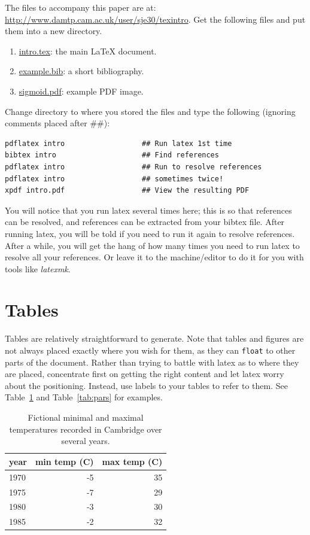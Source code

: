 \documentclass[]{article}
\providecommand*{\latex}{\LaTeX\xspace}
\begin{document}
The files to accompany this paper are at:
\url{http://www.damtp.cam.ac.uk/user/sje30/texintro}.  Get the
following files and put them into a new directory.

\begin{enumerate}
\item \url{intro.tex}: the main \latex document.
\item \url{example.bib}: a short bibliography.
\item \url{sigmoid.pdf}: example PDF image.
\end{enumerate}

Change directory to where you stored the files and type the
following (ignoring comments placed after \#\#):

\begin{verbatim}
pdflatex intro                  ## Run latex 1st time
bibtex intro                    ## Find references
pdflatex intro                  ## Run to resolve references
pdflatex intro                  ## sometimes twice!
xpdf intro.pdf                  ## View the resulting PDF
\end{verbatim}

You will notice that you run latex several times here; this is so that
references can be resolved, and references can be extracted from your
bibtex file.  After running latex, you will be told if you need to run
it again to resolve references.  After a while, you will get the hang
of how many times you need to run latex to resolve all your
references.  Or leave it to the machine/editor to do it for you with
tools like \textit{latexmk}.

\section{Tables}

Tables are relatively straightforward to generate.  Note that tables
and figures are not always placed exactly where you wish for them, as
they can \texttt{float} to other parts of the document.  Rather than
trying to battle with latex as to where they are placed, concentrate
first on getting the right content and let latex worry about the
positioning.  Instead, use labels to your tables to refer to them.
See Table~\ref{tab:simple} and Table~\ref{tab:pars} for examples.


\begin{table}
  \centering
  \begin{tabular}{|l|rr|}
    \hline
    year & min temp (C) & max temp (C)\\ \hline
    1970 & -5 & 35\\
    1975 & -7 & 29\\
    1980 & -3 & 30\\
    1985 & -2 & 32\\ \hline
  \end{tabular}
  \caption{Fictional minimal and maximal temperatures recorded in
    Cambridge over several years.}
  \label{tab:simple}
\end{table}
\end{document}
